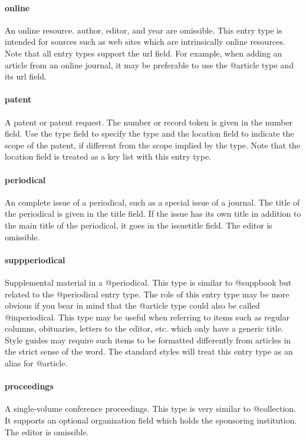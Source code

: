 \documentclass[a4paper,12pt]{report}
\begin{document}
\paragraph{online}
An online resource. author, editor, and year are omissible. This entry
type is intended for sources such as web sites which are intrinsically online resources. Note
that all entry types support the url field. For example, when adding an article from an
online journal, it may be preferable to use the @article type and its url field.

\paragraph{patent}
A patent or patent request. The number or record token is given in the number field. Use
the type field to specify the type and the location field to indicate the scope of the patent,
if different from the scope implied by the type. Note that the location field is treated as a
key list with this entry type.

\paragraph{periodical}
An complete issue of a periodical, such as a special issue of a journal. The title of the
periodical is given in the title field. If the issue has its own title in addition to the main
title of the periodical, it goes in the issuetitle field. The editor is omissible.

\paragraph{suppperiodical}
Supplemental material in a @periodical. This type is similar to @suppbook but related to
the @periodical entry type. The role of this entry type may be more obvious if you bear in
mind that the @article type could also be called @inperiodical. This type may be useful
when referring to items such as regular columns, obituaries, letters to the editor, etc. which
only have a generic title. Style guides may require such items to be formatted differently
from articles in the strict sense of the word. The standard styles will treat this entry type
as an alias for @article.

\paragraph{proceedings}
A single-volume conference proceedings. This type is very similar to @collection. It
supports an optional organization field which holds the sponsoring institution. The
editor is omissible.
\end{document}
